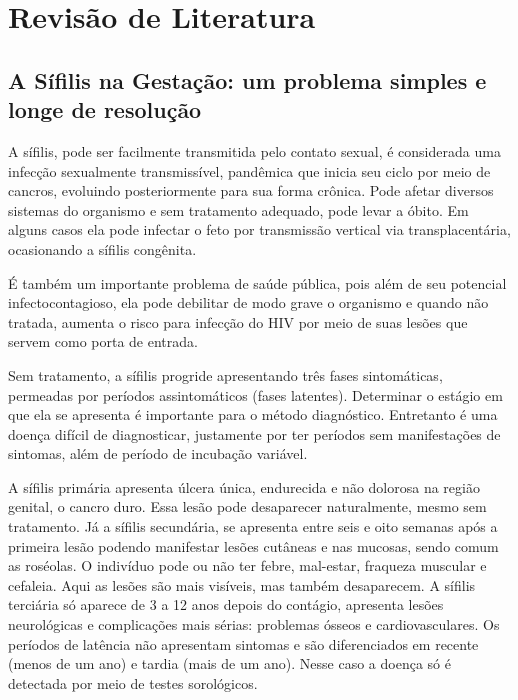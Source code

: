 \chapter{Revisão de Literatura}
\label{sec:revisao}

\section{A Sífilis na Gestação: um problema simples e longe de resolução}
A sífilis, pode ser facilmente transmitida pelo contato sexual, é considerada uma infecção sexualmente transmissível, pandêmica que inicia seu ciclo por meio de cancros, evoluindo posteriormente para sua forma crônica. Pode afetar diversos sistemas do organismo e sem tratamento adequado, pode levar a óbito. Em alguns casos ela pode infectar o feto por transmissão vertical via transplacentária, ocasionando a sífilis congênita. \cite{silva2015feelings}

É também um importante problema de saúde pública, pois além de seu potencial infectocontagioso, ela pode debilitar de modo grave o organismo e quando não tratada, aumenta o risco para infecção do HIV por meio de suas lesões que servem como porta de entrada. \cite{manual2016sifilis}

Sem tratamento, a sífilis progride apresentando três fases sintomáticas, permeadas por períodos assintomáticos (fases latentes). Determinar o estágio em que ela se apresenta é importante para o método diagnóstico. Entretanto é uma doença difícil de diagnosticar, justamente por ter períodos sem manifestações de sintomas, além de período de incubação variável. \cite{manual2016sifilis}

A sífilis primária apresenta úlcera única, endurecida e não dolorosa  na região genital, o cancro duro. Essa lesão pode desaparecer naturalmente, mesmo sem tratamento. Já a sífilis secundária, se apresenta entre seis e oito semanas após a primeira lesão podendo manifestar lesões cutâneas e nas mucosas, sendo comum as roséolas. O indivíduo pode ou não ter febre, mal-estar, fraqueza muscular e cefaleia. Aqui as lesões são mais visíveis, mas também desaparecem. A sífilis terciária só aparece de 3 a 12 anos depois do contágio, apresenta lesões neurológicas e complicações mais sérias: problemas ósseos e cardiovasculares. Os períodos de latência não apresentam sintomas e são diferenciados em recente (menos de um ano) e tardia (mais de um ano). Nesse caso a doença só é detectada por meio de testes sorológicos. \cite{manual2016sifilis}

